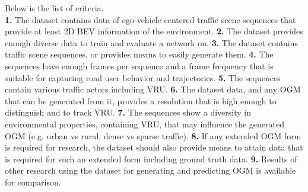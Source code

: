 \begin{table}[h!]
{		Below is the list of criteria. \\\hspace{\textwidth} 	
		\textbf{1.} The dataset contains data of ego-vehicle centered traffic scene sequences that provide at least 2D BEV information of the environment.
		\textbf{2.} The dataset provides enough diverse data to train and evaluate a network on.
		\textbf{3.} The dataset contains traffic scene sequences, or provides means to easily generate them.
		\textbf{4.} The sequences have enough frames per sequence and a frame frequency that is suitable for capturing road user behavior and trajectories.
		\textbf{5.} The sequences contain various traffic actors including VRU.
		\textbf{6.} The dataset data, and any OGM that can be generated from it, provides a resolution that is high enough to distinguish and to track VRU. 
		\textbf{7.} The sequences show a diversity in environmental properties, containing VRU, that may influence the generated OGM (e.g. urban vs rural, dense vs sparse traffic).
		\textbf{8.} If any extended OGM form is required for research, the dataset should also provide means to attain data that is required for such an extended form including ground truth data.
		\textbf{9.} Results of other research using the dataset for generating and predicting OGM is available for comparison.}
	\label{tab:datasets_criteria}
\end{table}


